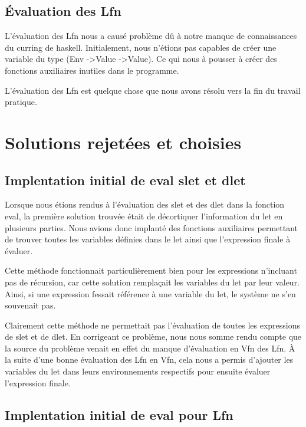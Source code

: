 \documentclass[12pt, letterpaper]{article}
\begin{document}
\subsection*{Évaluation des Lfn}

L'évaluation des Lfn nous a causé problème dû à notre manque de connaissances du
curring de haskell. Initialement, nous n'étions pas capables de créer une 
variable du type (Env -\textgreater Value -\textgreater Value). Ce qui nous à 
pousser à créer des fonctions auxiliaires inutiles dans le programme.

L'évaluation des Lfn est quelque chose que nous avons résolu vers la fin du
travail pratique.

\section*{Solutions rejetées et choisies}

\subsection*{Implentation initial de eval slet et dlet}

Lorsque nous étions rendus à l'évaluation des slet et des dlet dans la fonction
eval, la première solution trouvée était de décortiquer l'information du let
en plusieurs parties. Nous avions donc implanté des fonctions auxiliaires
permettant de trouver toutes les variables définies dans le let ainsi que
l'expression finale à évaluer.

Cette méthode fonctionnait particulièrement bien pour les expressions n'incluant
pas de récursion, car cette solution remplaçait les variables du let par leur
valeur. Ainsi, si une expression fessait référence à une variable du let, le
système ne s'en souvenait pas.

Clairement cette méthode ne permettait pas l'évaluation de toutes les
expressions de slet et de dlet. En corrigeant ce problème, nous nous somme
rendu compte que la source du problème venait en effet du manque d'évaluation
en Vfn des Lfn. À la suite d’une bonne évaluation des Lfn en Vfn, cela nous a 
permis d'ajouter les variables du let dans leurs environnements respectifs pour 
ensuite évaluer l'expression finale.

\subsection*{Implentation initial de eval pour Lfn}
\end{document}
